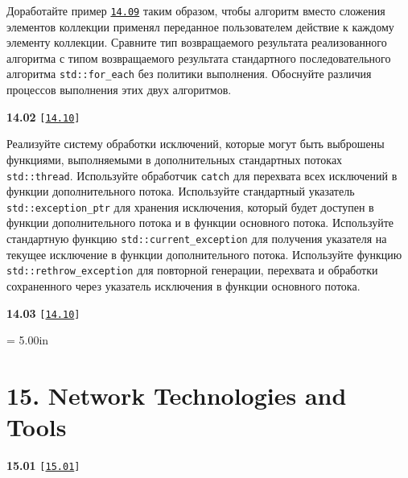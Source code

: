 \documentclass[a4paper,12pt]{article}
\begin{document}
\bigskip

Доработайте пример \href{https://github.com/i-s-m-mipt/Education/blob/master/projects/examples/source/14.09.cpp}{\texttt{14.09}} таким образом, чтобы алгоритм вместо сложения элементов коллекции применял переданное пользователем действие к каждому элементу коллекции. Сравните тип возвращаемого результата реализованного алгоритма с типом возвращаемого результата стандартного последовательного алгоритма \lstinline{std::for_each} без политики выполнения. Обоснуйте различия процессов выполнения этих двух алгоритмов.

\bigskip

{\large \textbf{14.02} \texttt{[\href{https://github.com/i-s-m-mipt/Education/blob/master/projects/examples/source/14.10.cpp}{\texttt{14.10}}]}}

\bigskip

Реализуйте систему обработки исключений, которые могут быть выброшены функциями, выполняемыми в дополнительных стандартных потоках \lstinline{std::thread}. Используйте обработчик \lstinline{catch} для перехвата всех исключений в функции дополнительного потока. Используйте стандартный указатель \lstinline{std::exception_ptr} для хранения исключения, который будет доступен в функции дополнительного потока и в функции основного потока. Используйте стандартную функцию \lstinline{std::current_exception} для получения указателя на текущее исключение в функции дополнительного потока. Используйте функцию \lstinline{std::rethrow_exception} для повторной генерации, перехвата и обработки сохраненного через указатель исключения в функции основного потока.

\bigskip

{\large \textbf{14.03} \texttt{[\href{https://github.com/i-s-m-mipt/Education/blob/master/projects/examples/source/14.10.cpp}{\texttt{14.10}}]}}

\bigskip





\newpage\thispagestyle{empty}\pdfpageheight = 5.00in\enlargethispage{100in}

\section{15. Network Technologies and Tools}

{\large \textbf{15.01} \texttt{[\href{https://github.com/i-s-m-mipt/Education/blob/master/projects/examples/source/15.01.cpp}{\texttt{15.01}}]}}
\end{document}
